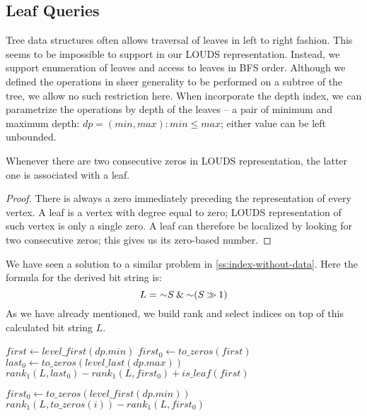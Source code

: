 \subsection{\label{ss:leaf-queries}Leaf Queries}

Tree data structures often allows traversal of leaves in left to right fashion.
This seems to be impossible to support in our LOUDS representation.
Instead, we support enumeration of leaves and access to leaves in BFS order.
Although we defined the operations in sheer generality to be performed on a subtree of the tree, we allow no such restriction here.
When incorporate the depth index, we can parametrize the operations by depth of the leaves -- a pair of minimum and maximum depth: $dp = (min, max): min \le max$; either value can be left unbounded.

\begin{lemma}
	Whenever there are two consecutive zeros in LOUDS representation, the latter one is associated with a leaf.
\end{lemma}
\begin{proof}
	There is always a zero immediately preceding the representation of every vertex.
	A leaf is a vertex with degree equal to zero; LOUDS representation of such vertex is only a single zero.
	A leaf can therefore be localized by looking for two consecutive zeros; this gives us its zero-based number.
\end{proof}

We have seen a solution to a similar problem in \ref{ss:index-without-data}.
Here the formula for the derived bit string is:
$$L = \mathord{\sim} S \mathbin{\&} \mathord{\sim} (S \mathbin{\gg} 1)$$
As we have already mentioned, we build rank and select indices on top of this calculated bit string $L$.

\begin{algorithmic}
	\State $first \gets level\_first(dp.min)$ 
	\State $first_0 \gets to\_zeros(first)$
	\State $last_0 \gets to\_zeros(level\_last(dp.max))$
	\State \Return $rank_1(L, last_0) - rank_1(L, first_0) + is\_leaf(first)$
\EndFunction
\end{algorithmic}

\begin{algorithmic}	
		\State {}
		\State {}
	\Else
		\State $first_0 \gets to\_zeros(level\_first(dp.min))$
		\State $rank_1(L, to\_zeros(i)) - rank_1(L, first_0)$
	\EndIf
\EndFunction
\end{algorithmic}

